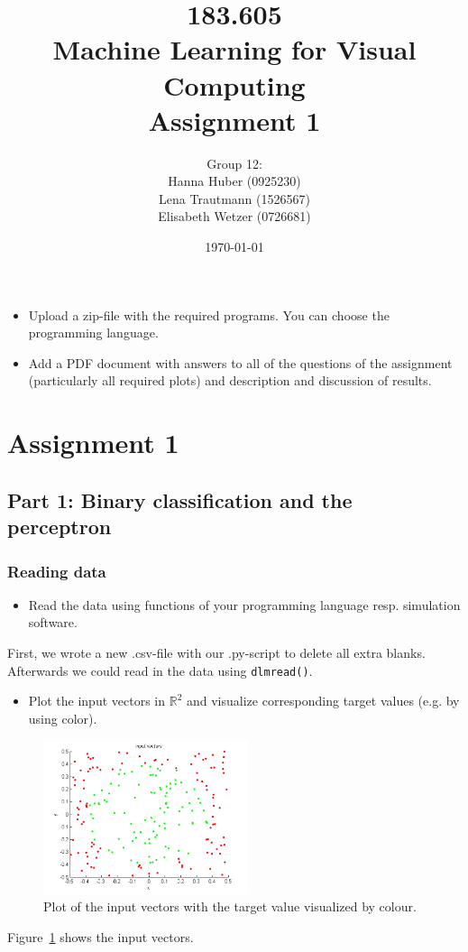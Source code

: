 \documentclass[a4]{article}
\title{\bf 183.605 \\ Machine Learning for Visual Computing \\ Assignment 1}
\author{Group 12: \\
	Hanna Huber (0925230) \\ Lena Trautmann (1526567) \\ Elisabeth Wetzer (0726681)}
\date{\today}
\begin{document}
\maketitle
\noindent

\begin{itemize}
\item Upload a zip-file with the required programs. You can choose the programming language.
\item Add a PDF document with answers to all of the questions of the assignment (particularly all required plots) and description and discussion of results. 
\end{itemize}

\section{Assignment 1}
\subsection{Part 1: Binary classification and the perceptron}

\subsubsection{Reading data}\label{sec:readdata}

\begin{itemize}
\item Read the data using functions of your programming language resp. simulation software.
\end{itemize}
First, we wrote a new .csv-file with our .py-script to delete all extra blanks. Afterwards we could read in the data using \texttt{dlmread()}.

\begin{itemize}
\item Plot the input vectors in $\mathbb{R}^2$ and visualize corresponding target values (e.g. by using color). 
\end{itemize}
\begin{figure}[!h]
	\begin{center}
		\centering
		\includegraphics[width=6cm]{../figures/inputVectors.pdf}
	\end{center}	
	\caption{Plot of the input vectors with the target value visualized by colour.}
	\label{fig:inputVectors}
\end{figure}
Figure~\ref{fig:inputVectors} shows the input vectors.
\end{document}

